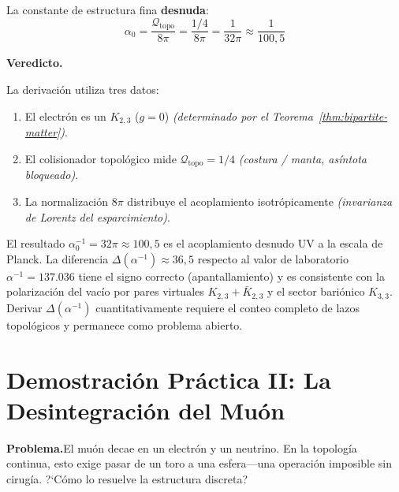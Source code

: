 \documentclass[11pt, a4paper, openany]{book}
\begin{document}
La constante de estructura fina \textbf{desnuda}:
\begin{equation}
  \boxed{\;
  \alpha_0
  = \frac{\mathcal{Q}_{\mathrm{topo}}}{8\pi}
  = \frac{1/4}{8\pi}
  = \frac{1}{32\pi}
  \approx \frac{1}{100{,}5}
  \;}
  \tag{$\alpha$-I}
\end{equation}

\bigskip
\noindent
\textbf{Veredicto.}

\begin{result}[title={Inventario completo de la derivaci\'on}]
La derivaci\'on utiliza tres datos:
\begin{enumerate}
  \item El electr\'on es un $K_{2,3}$ ($g = 0$)
    \hfill\textit{(determinado por el Teorema~\ref{thm:bipartite-matter})}.
  \item El colisionador topol\'ogico mide
    $\mathcal{Q}_{\mathrm{topo}} = 1/4$
    \hfill\textit{(costura / manta, as\'intota bloqueado)}.
  \item La normalizaci\'on $8\pi$ distribuye el acoplamiento isotr\'opicamente
    \hfill\textit{(invarianza de Lorentz del esparcimiento)}.
\end{enumerate}
El resultado $\alpha_0^{-1} = 32\pi \approx 100{,}5$ es el acoplamiento
desnudo UV a la escala de Planck. La diferencia
$\Delta(\alpha^{-1}) \approx 36{,}5$ respecto al valor de laboratorio
$\alpha^{-1} = 137{.}036$ tiene el signo correcto (apantallamiento) y
es consistente con la polarizaci\'on del vac\'io por pares virtuales
$K_{2,3} + \bar{K}_{2,3}$ y el sector bari\'onico $K_{3,3}$.
Derivar $\Delta(\alpha^{-1})$ cuantitativamente requiere el conteo
completo de lazos topol\'ogicos y permanece como problema abierto.
\end{result}

\bigskip

\section*{Demostraci\'on Pr\'actica II: La Desintegraci\'on del Mu\'on}
\label{sec:demo-muon}

\noindent\textbf{Problema.}\enspace El mu\'on decae en un electr\'on y un
neutrino. En la topolog\'ia continua, esto exige pasar de un toro a una
esfera---una operaci\'on imposible sin cirug\'ia. ?`C\'omo lo resuelve la
estructura discreta?
\end{document}

